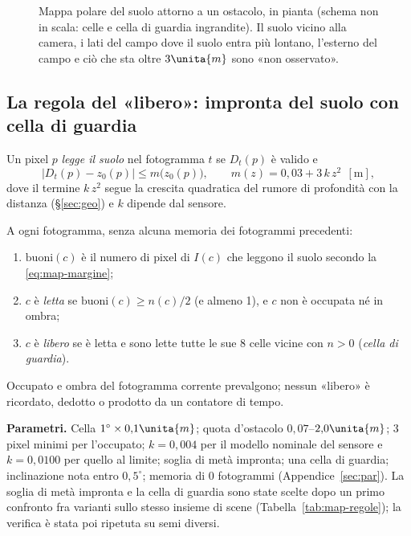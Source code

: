 \begin{figure}[H]
\caption{Mappa polare del suolo attorno a un ostacolo, in pianta (schema non in scala: celle e cella di guardia ingrandite). Il suolo vicino alla camera, i lati del campo dove il suolo entra più lontano, l'esterno del campo e ciò che sta oltre $3\unita{m}$ sono «non osservato».}\label{fig:map-polare}
\end{figure}

\subsection{La regola del «libero»: impronta del suolo con cella di guardia}\label{sec:map-regola}

Un pixel $p$ \emph{legge il suolo} nel fotogramma $t$ se $D_t(p)$ è valido e
\begin{equation}\label{eq:map-margine}
|D_t(p)-z_0(p)|\le m\big(z_0(p)\big),\qquad m(z)=0{,}03+3\,k\,z^2\ \ [\mathrm{m}],
\end{equation}
dove il termine $k\,z^2$ segue la crescita quadratica del rumore di profondità con la distanza (\S\ref{sec:geo}) e $k$ dipende dal sensore.

\begin{definizione}\label{def:map-libero}
A ogni fotogramma, senza alcuna memoria dei fotogrammi precedenti:
\begin{enumerate}
\item $\mathrm{buoni}(c)$ è il numero di pixel di $I(c)$ che leggono il suolo secondo la \eqref{eq:map-margine};
\item $c$ è \emph{letta} se $\mathrm{buoni}(c)\ge n(c)/2$ (e almeno 1), e $c$ non è occupata né in ombra;
\item $c$ è \emph{libero} se è letta e sono lette tutte le sue 8 celle vicine con $n>0$ (\emph{cella di guardia}).
\end{enumerate}
Occupato e ombra del fotogramma corrente prevalgono; nessun «libero» è ricordato, dedotto o prodotto da un contatore di tempo.
\end{definizione}

\textbf{Parametri.} Cella $1^\circ\times0{,}1\unita{m}$; quota d'ostacolo $0{,}07$–$2{,}0\unita{m}$; 3 pixel minimi per l'occupato; $k=0{,}004$ per il modello nominale del sensore e $k=0{,}0100$ per quello al limite; soglia di metà impronta; una cella di guardia; inclinazione nota entro $0{,}5^\circ$; memoria di 0 fotogrammi (Appendice~\ref{sec:par}). La soglia di metà impronta e la cella di guardia sono state scelte dopo un primo confronto fra varianti sullo stesso insieme di scene (Tabella~\ref{tab:map-regole}); la verifica è stata poi ripetuta su semi diversi.

